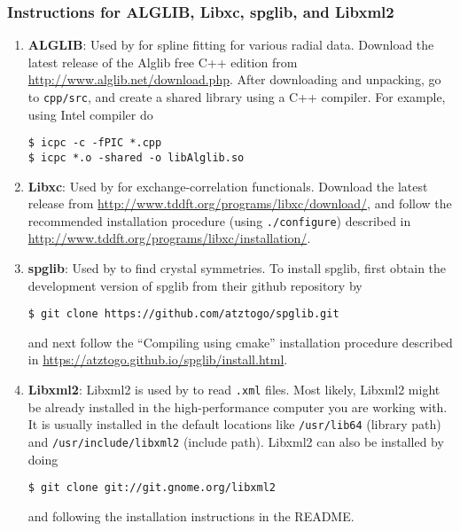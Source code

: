 \subsubsection{Instructions for ALGLIB, Libxc, spglib, and Libxml2}
\begin{enumerate}
	\item   {\bf ALGLIB}: Used by \dftfe{} for spline fitting for various radial data. Download the latest release of the Alglib free C++ edition from \url{http://www.alglib.net/download.php}. After downloading and unpacking, go to \verb|cpp/src|, and create a shared library using a C++ compiler. For example, using Intel compiler do
\begin{verbatim}
$ icpc -c -fPIC *.cpp
$ icpc *.o -shared -o libAlglib.so
\end{verbatim}
\item {\bf Libxc}: Used by \dftfe{} for exchange-correlation functionals. Download the latest release from \url{http://www.tddft.org/programs/libxc/download/}, and follow the recommended installation procedure (using \verb|./configure|) described in \url{http://www.tddft.org/programs/libxc/installation/}.

\item {\bf spglib}: Used by \dftfe{} to find crystal symmetries. To install spglib, first obtain the development version of spglib from their github repository by
\begin{verbatim}
$ git clone https://github.com/atztogo/spglib.git	
\end{verbatim}	
and next follow the ``Compiling using cmake'' installation procedure described in \url{https://atztogo.github.io/spglib/install.html}.   	

\item {\bf Libxml2}: Libxml2 is used by \dftfe{} to read \verb|.xml| files. Most likely, Libxml2 might be already installed in the high-performance computer you are working with. It is usually installed in the default locations like \verb|/usr/lib64| (library path) and \verb|/usr/include/libxml2| (include path). Libxml2 can also be installed by doing
\begin{verbatim}
$ git clone git://git.gnome.org/libxml2	
\end{verbatim}
and following the installation instructions in the README.
\end{enumerate}

